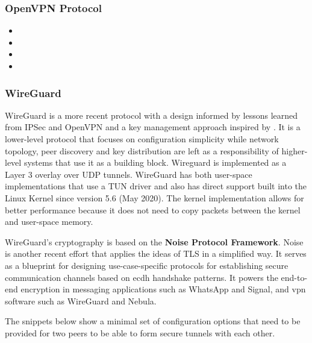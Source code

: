 \hypertarget{openvpn-protocol}{%
\subsubsection{OpenVPN Protocol}\label{openvpn-protocol}}

\begin{itemize}
\tightlist
\item
\item
\item
\item
\end{itemize}

\hypertarget{wireguard}{%
\subsubsection{WireGuard}\label{wireguard}}

WireGuard \autocite{donenfeldWireGuardNextGeneration2017} is a more
recent protocol with a design informed by lessons learned from IPSec and
OpenVPN and a key management approach inspired by . It is a
lower-level protocol that focuses on configuration simplicity while
network topology, peer discovery and key distribution are left as a
responsibility of higher-level systems that use it as a building block.
Wireguard is implemented as a Layer 3 overlay over UDP tunnels.
WireGuard has both user-space implementations that use a TUN driver and
also has direct support built into the Linux Kernel since version 5.6
(May 2020). The kernel implementation allows for better performance
because it does not need to copy packets between the kernel and
user-space memory.

WireGuard's cryptography is based on the \textbf{Noise Protocol
Framework}\autocite{noiseDocs}. Noise is another recent effort that
applies the ideas of TLS in a simplified way. It serves as a blueprint
for designing use-case-specific protocols for establishing secure
communication channels based on \gls{ecdh} handshake patterns. It powers
the end-to-end encryption in messaging applications such as WhatsApp and
Signal, and \gls{vpn} software such as WireGuard and Nebula.
 

The snippets below show a minimal set of configuration options that need
to be provided for two peers to be able to form secure tunnels with each
other.

\begin{Shaded}
\begin{Highlighting}[]
\KeywordTok{[Interface]}
\OtherTok{=}
\OtherTok{=}\StringTok{ }
\OtherTok{=}

\KeywordTok{[Peer]}
\OtherTok{=}
\OtherTok{=}
\OtherTok{=}
\end{Highlighting}
\end{Shaded}

